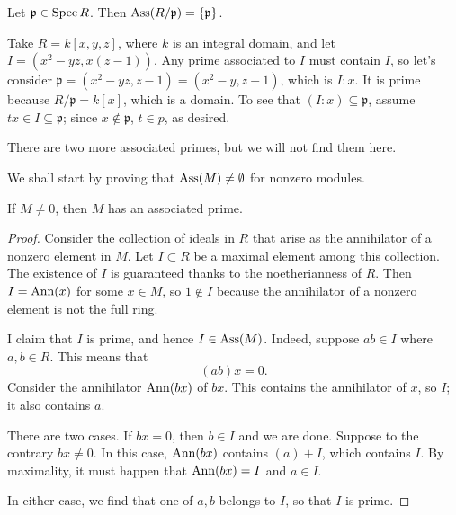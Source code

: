 \begin{exercise} 
Let $\mathfrak{p} \in \operatorname{Spec} R$. Then $\operatorname{Ass}(R/\mathfrak{p}) =
\left\{\mathfrak{p}\right\}$.
\end{exercise} 

\begin{example}
Take $R=k[x,y,z]$, where $k$ is an integral domain, and let $I = (x^2-yz,x(z-1))$. Any
 prime associated to $I$ must contain $I$, so let's consider
   $\mathfrak{p}=(x^2-yz,z-1)=(x^2-y,z-1)$, which is $I:x$. It is prime because $R/\mathfrak{p} = k[x]$,
   which is a domain. To see that $(I:x)\subseteq \mathfrak{p}$, assume $tx\in I\subseteq \mathfrak{p}$; since
   $x\not\in \mathfrak{p}$, $t\in p$, as desired.

   There are two more associated primes, but we will not find them here.
 \end{example}


We shall start by proving that $\operatorname{Ass}(M) \neq \emptyset$ for nonzero modules. 
\begin{proposition} \label{assmnonempty} 
If $M \neq 0$, then $M$ has an associated prime.
\end{proposition} 
\begin{proof}  Consider the collection of ideals in $R$ that arise as the
annihilator of a nonzero element in $M$. 
Let $I \subset R$ be a maximal element among this collection.  The existence of $I$ is guaranteed thanks to the noetherianness of
$R$.
Then $I = \operatorname{Ann}(x)$ for some $x \in M$, so  $1 \notin I$ because the annihilator of a nonzero element is not the full
ring.

I claim that
$I$ is prime,  and hence $I \in \operatorname{Ass}(M)$.  
Indeed, suppose $ab \in I$ where $a,b \in R$. This means that
\[ (ab)x = 0.  \]
Consider the annihilator $\operatorname{Ann}(bx)$ of $bx$. This contains the annihilator of $x$, so $I$;
it also contains $a$.

There are two cases. If $bx = 0$, then $ b \in I$ and we are done. Suppose to
the contrary $bx \neq 0$. In this case, $\operatorname{Ann}(bx)$ contains $(a) + I$, which
 contains $I$. By maximality, it must happen that $\operatorname{Ann}(bx) = I$ and $ a \in
 I$. 

 In either case, we find that one of $a,b $ belongs to $I$, so that $I$ is
 prime. 

\end{proof} 

